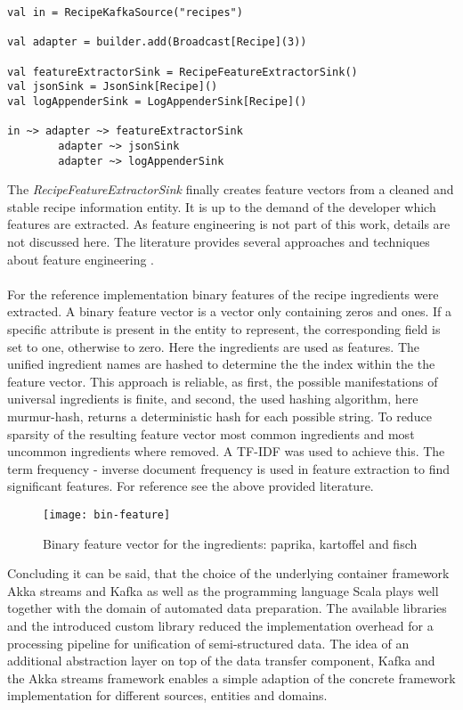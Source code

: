 \begin{lstlisting}[style=myScalastyle,label={lst:output},caption={Example of akka streams graph DSL for splitting streams}]
val in = RecipeKafkaSource("recipes")

val adapter = builder.add(Broadcast[Recipe](3))

val featureExtractorSink = RecipeFeatureExtractorSink()
val jsonSink = JsonSink[Recipe]()
val logAppenderSink = LogAppenderSink[Recipe]()

in ~> adapter ~> featureExtractorSink
        adapter ~> jsonSink
        adapter ~> logAppenderSink
\end{lstlisting}

The \textit{RecipeFeatureExtractorSink} finally creates feature vectors from a cleaned and stable recipe information entity. It is up to the demand of the developer which features are extracted. As feature engineering is not part of this work, details are not discussed here. The literature provides several approaches and techniques about feature engineering\cite{mastering_feature_engineering_2017} \cite{liu_2001}. 
\\\\
For the reference implementation binary features of the recipe ingredients were extracted. A binary feature vector is a vector only containing zeros and ones. If a specific attribute is present in the entity to represent, the corresponding field is set to one, otherwise to zero. Here the ingredients are used as features. The unified ingredient names are hashed to determine the the index within the the feature vector. This approach is reliable, as first, the possible manifestations of universal ingredients is finite, and second, the used hashing algorithm, here murmur-hash, returns a deterministic hash for each possible string. To reduce sparsity of the resulting feature vector most common ingredients and most uncommon ingredients where removed. A TF-IDF was used to achieve this. The term frequency - inverse document frequency is used in feature extraction to find significant features. For reference see the above provided literature.

\begin{figure}[htb]
  \centering
  \texttt{[image: bin-feature]}\\
  \caption{Binary feature vector for the ingredients: paprika, kartoffel and fisch}
  \label{fig:bin-feature}
\end{figure}

Concluding it can be said, that the choice of the underlying container framework Akka streams and Kafka as well as the programming language Scala plays well together with the domain of automated data preparation. The available libraries and the introduced custom library reduced the implementation overhead for a processing pipeline for unification of semi-structured data. The idea of an additional abstraction layer on top of the data transfer component, Kafka and the Akka streams framework enables a simple adaption of the concrete framework implementation for different sources, entities and domains.

